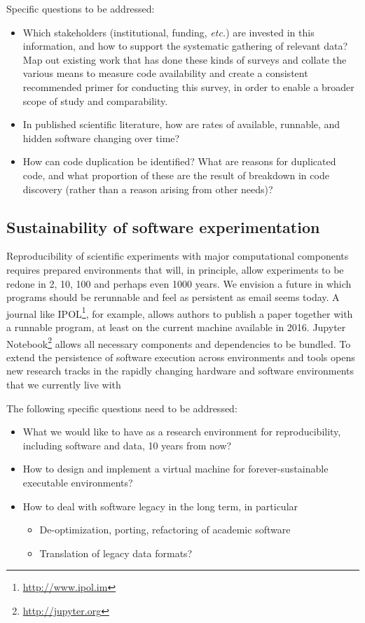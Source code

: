 \documentclass[a4paper,UKenglish]{dagman}
\newcommand{\etc}{\emph{etc.}\xspace}
\begin{document}
Specific questions to be addressed:
\begin{itemize}
\item Which stakeholders (institutional, funding, \etc) are invested in this information, and how to support the systematic gathering of relevant data? Map out existing work that has done these kinds of surveys and collate the various means to measure code availability and create a consistent recommended primer for conducting this survey, in order to enable a broader scope of study and comparability.
\item In published scientific literature, how are rates of available, runnable, and hidden software changing over time?
\item How can code duplication be identified? What are reasons for duplicated code, and what proportion of these are the result of breakdown in code discovery (rather than a reason arising from other needs)?
\end{itemize}

\subsection{Sustainability of software experimentation}

Reproducibility of scientific experiments with major computational components requires prepared environments that will, in principle, allow experiments to be redone in 2, 10, 100 and perhaps even 1000 years. We envision a future in which programs should be rerunnable and feel as persistent as email seems today. A journal like IPOL\footnote{\url{http://www.ipol.im}}, for example, allows authors to publish a paper together with a runnable program, at least on the current machine available in 2016. Jupyter Notebook\footnote{\url{http://jupyter.org}} allows all necessary components and dependencies to be bundled. To extend the persistence of software execution across environments and tools opens new research tracks in the rapidly changing hardware and software environments that we currently live with

The following specific questions need to be addressed:

\begin{itemize}
\item What we would like to have as a research environment for reproducibility, including  software and data, 10 years from now? 
\item How to design and implement a virtual machine for forever-sustainable executable environments? 
\item How to deal with software legacy in the long term, in particular
    \begin{itemize}
    \item De-optimization, porting, refactoring of academic software
    \item Translation of legacy data formats?
    \end{itemize}
\end{itemize}
\end{document}
